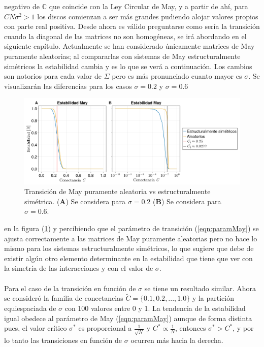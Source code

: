 negativo de $\mathbb{C}$ que coincide con la Ley Circular de May, y a partir de ahí, para $CN\sigma^2>1$ los discos comienzan a ser más grandes pudiendo alojar valores propios con parte real positiva. Desde ahora es válido preguntarse como sería la transición cuando la diagonal de las matrices no son homogéneas, se irá abordando en el siguiente capítulo. Actualmente se han considerado únicamente matrices de May puramente aleatorias; al compararlas con sistemas de May estructuralmente simétricos la estabilidad cambia y es lo que se verá a continuación. Los cambios son notorios para cada valor de $\Sigma$ pero es más pronunciado cuanto mayor es $\sigma$. Se visualizarán las diferencias para los casos $\sigma= 0.2$ y $\sigma = 0.6$
\begin{figure}[h!]
	\centering
	\includegraphics[scale = 0.165]{../Imagenes/TransicionDirvsNoDir}
	\caption{Transición de May puramente aleatoria vs estructuralmente simétrica. (\textbf{A}) Se considera para $\sigma = 0.2$ (\textbf{B}) Se considera para $\sigma=0.6$.}
	\label{fig:TransicionDirvsNoDir}
\end{figure}
en la figura (\ref{fig:TransicionDirvsNoDir}) y percibiendo que el parámetro de transición (\ref{eqn:paramMay}) se ajusta correctamente a las matrices de May puramente aleatorias pero no hace lo mismo para los sistemas estructuralmente simétricos, lo que sugiere que debe de existir algún otro elemento determinante en la estabilidad que tiene que ver con la simetría de las interacciones y con el valor de $\sigma$.
\\
\\
Para el caso de la transición en función de $\sigma$ se tiene un resultado similar. Ahora se consideró la familia de conectancias $\tilde{C}=\{0.1,0.2,...,1.0\}$ y la partición equiespaciada de $\sigma$ con 100 valores entre 0 y 1. La tendencia de la estabilidad igual obedece al parámetro de May (\ref{eqn:paramMay}) aunque de forma distinta pues, el valor crítico $\sigma^*$ es proporcional a $\frac{1}{\sqrt{N}}$ y $C^*\propto \frac{1}{N}$, entonces $\sigma^*>C^*$, y por lo tanto las transiciones en función de $\sigma$ ocurren más hacia la derecha. 
